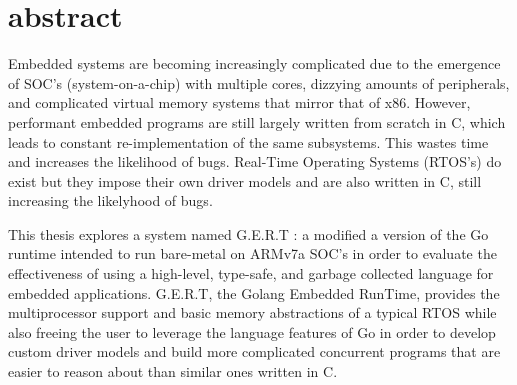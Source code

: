 % 
% 
%
\section{abstract}

Embedded systems are becoming increasingly complicated due
to the emergence of SOC's (system-on-a-chip) with multiple cores, dizzying amounts of peripherals, and
complicated virtual memory systems that mirror that of x86. However,
performant embedded programs are still largely written from scratch in
C, which leads to constant re-implementation of the same subsystems. This wastes time and increases the likelihood of bugs.
Real-Time Operating Systems (RTOS's) do exist but they impose their own
driver models and are also written in C, still increasing the likelyhood
of bugs.\par
  This thesis explores a system named G.E.R.T : a modified a version of the Go runtime intended to run
bare-metal on ARMv7a SOC's in order to evaluate
the effectiveness of using a high-level, type-safe, and garbage collected
language for embedded applications. G.E.R.T, the Golang Embedded RunTime,
provides the multiprocessor support and basic memory abstractions of a
typical RTOS while also freeing the user to leverage the language features
of Go in order to develop custom driver models and build more complicated
concurrent programs that are easier to reason about than similar ones
written in C.


